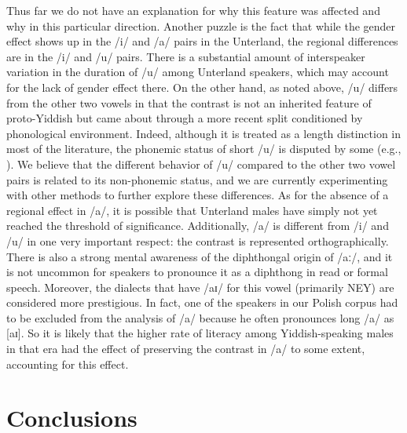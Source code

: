 \documentclass[output=paper,colorlinks,citecolor=brown]{langscibook}
\begin{document}
Thus far we do not have an explanation for why this feature was affected and why in this particular direction. Another puzzle is the fact that while the gender effect shows up in the \mbox{/i/} and \mbox{/a/} pairs in the Unterland, the regional differences are in the \mbox{/i/} and \mbox{/u/} pairs. There is a substantial amount of interspeaker variation in the duration of \mbox{/u/} among Unterland speakers, which may account for the lack of gender effect there. On the other hand, as noted above, \mbox{/u/} differs from the other two vowels in that the contrast is not an inherited feature of proto\hyp Yiddish but came about through a more recent split conditioned by phonological environment. Indeed, although it is treated as a length distinction in most of the literature, the phonemic status of short \mbox{/u/} is disputed by some (e.g., \citealt{Beider2015}). We believe that the different behavior of \mbox{/u/} compared to the other two vowel pairs is related to its non-phonemic status, and we are currently experimenting with other methods to further explore these differences. As for the absence of a regional effect in \mbox{/a/}, it is possible that Unterland males have simply not yet reached the threshold of significance. Additionally, \mbox{/a/} is different from \mbox{/i/} and \mbox{/u/} in one very important respect: the contrast is represented orthographically. There is also a strong mental awareness of the diphthongal origin of \mbox{/aː/}, and it is not uncommon for speakers to pronounce it as a diphthong in read or formal speech. Moreover, the dialects that have \mbox{/aɪ/} for this vowel (primarily NEY) are considered more prestigious. In fact, one of the speakers in our Polish corpus had to be excluded from the analysis of \mbox{/a/} because he often pronounces long \mbox{/a/} as [aɪ]. So it is likely that the higher rate of literacy among Yiddish\hyp speaking males in that era had the effect of preserving the contrast in \mbox{/a/} to some extent, accounting for this effect.

\section{Conclusions}
\end{document}
